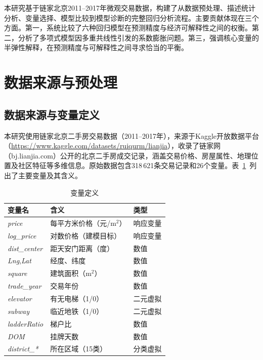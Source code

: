 \documentclass[12pt,a4paper]{ctexart}
\begin{document}
本研究基于链家北京2011--2017年微观交易数据，构建了从数据预处理、描述统计分析、变量选择、模型比较到模型诊断的完整回归分析流程。主要贡献体现在三个方面。第一，系统比较了六种回归模型在预测精度与经济可解释性之间的权衡。第二，分析了多项式模型因多重共线性引发的系数膨胀问题。第三，强调核心变量的半弹性解释，在预测精度与可解释性之间寻求恰当的平衡。

\section{数据来源与预处理}

\subsection{数据来源与变量定义}

本研究使用链家北京二手房交易数据（2011--2017年），来源于Kaggle开放数据平台（\url{https://www.kaggle.com/datasets/ruiqurm/lianjia}），收录了链家网（bj.lianjia.com）公开的北京二手房成交记录，涵盖交易价格、房屋属性、地理位置及社区特征等多维信息。原始数据包含318\,621条交易记录和26个变量。表~\ref{tab:variable_definition}~列出了主要变量及其含义。

\begin{table}[H]
\centering
\caption{变量定义}
\label{tab:variable_definition}
\begin{tabular}{lll}
\toprule
变量名 & 含义 & 类型 \\
\midrule
\textit{price}        & 每平方米价格（元/m$^{2}$） & 响应变量 \\
\textit{log\_price}   & 对数价格（建模目标）       & 响应变量 \\
\textit{dist\_center} & 距天安门距离（度） & 数值 \\
\textit{Lng},\;\textit{Lat} & 经度、纬度 & 数值 \\
\textit{square}       & 建筑面积（m$^{2}$） & 数值 \\
\textit{trade\_year}  & 交易年份 & 数值 \\
\textit{elevator}     & 有无电梯（1/0） & 二元虚拟 \\
\textit{subway}       & 临近地铁（1/0） & 二元虚拟 \\
\textit{ladderRatio}  & 梯户比 & 数值 \\
\textit{DOM}          & 挂牌天数 & 数值 \\
\textit{district\_*}  & 所在区域（15类） & 分类虚拟 \\
\bottomrule
\end{tabular}
\end{table}
\end{document}
